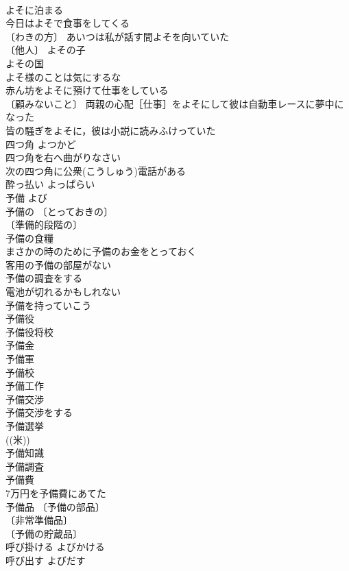 \documentclass[8pt]{extreport}
\begin{document}
\begin{CJK}{UTF8}{min}
\\	よそに泊まる 
\\	今日はよそで食事をしてくる 
\\	〔わきの方〕 あいつは私が話す間よそを向いていた 
\\	〔他人〕 よその子 
\\	よその国 
\\	よそ様のことは気にするな 
\\	赤ん坊をよそに預けて仕事をしている 
\\	〔顧みないこと〕 両親の心配［仕事］をよそにして彼は自動車レースに夢中になった 
\\	皆の騒ぎをよそに，彼は小説に読みふけっていた 
\\	四つ角	よつかど	
\\	四つ角を右へ曲がりなさい 
\\	次の四つ角に公衆(こうしゅう)電話がある 
\\	酔っ払い	よっぱらい	
\\	予備	よび	
\\	予備の 〔とっておきの〕
\\	〔準備的段階の〕
\\	予備の食糧 
\\	まさかの時のために予備のお金をとっておく 
\\	客用の予備の部屋がない 
\\	予備の調査をする 
\\	電池が切れるかもしれない
\\	予備を持っていこう 
\\	予備役 
\\	予備役将校 
\\	予備金 
\\	予備軍 
\\	予備校 
\\	予備工作 
\\	予備交渉 
\\	予備交渉をする 
\\	予備選挙 
\\	((米)) 
\\	予備知識 
\\	予備調査 
\\	予備費 
\\	7万円を予備費にあてた 
\\	予備品 〔予備の部品〕
\\	〔非常準備品〕
\\	〔予備の貯蔵品〕
\\	呼び掛ける	よびかける	
\\	呼び出す	よびだす	

\end{CJK}
\end{document}

